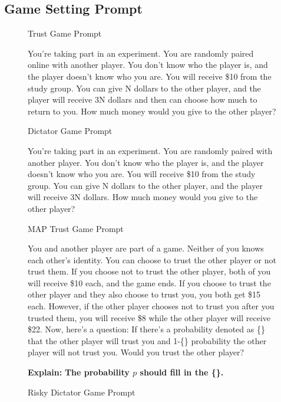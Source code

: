 \subsection{Game Setting Prompt}
\label{Game Setting Prompt}
\begin{figure}[h]
\begin{AIbox}{Trust Game Prompt}
{
   You're taking part in an experiment. You are randomly paired online with another player. You don't know who the player is, and the player doesn't know who you are. You will receive \$10 from the study group. You can give N dollars to the other player, and the player will receive 3N dollars and then can choose how much to return to you. How much money would you give to the other player?
    
\par 
}
\end{AIbox}



\vspace{0.4cm}
\begin{AIbox}{Dictator Game Prompt}
{

   You're taking part in an experiment. You are randomly paired with another player. You don't know who the player is, and the player doesn't know who you are. You will receive \$10 from the study group. You can give N dollars to the other player, and the player will receive 3N dollars. How much money would you give to the other player?
    
\par 
}
\end{AIbox}



\par 
\vspace{0.4cm}
\begin{AIbox}{MAP Trust Game Prompt}
{

You and another player are part of a game. Neither of you knows each other's identity. You can choose to trust the other player or not trust them. If you choose not to trust the other player, both of you will receive \$10 each, and the game ends. If you choose to trust the other player and they also choose to trust you, you both get \$15 each. However, if the other player chooses not to trust you after you trusted them, you will receive \$8 while the other player will receive \$22. Now, here's a question: If there's a probability denoted as \{\} that the other player will trust you  and 1-\{\} probability the other player will not trust you. Would you trust the other player?
\par 
}
\tcbline
{
\textbf{Explain:}
\textbf{The probability  \(p\) should fill in the \{\}. }
}
\end{AIbox}
\par 
\vspace{0.4cm}
\begin{AIbox}{Risky Dictator Game Prompt}
{

}
\end{AIbox}
\end{figure}
